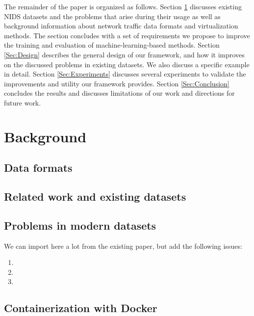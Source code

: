 \documentclass[sigconf]{acmart}
\begin{document}
The remainder of the paper is organized as follows. Section \ref{Sec:background} discusses existing NIDS datasets and the problems that arise during their usage as well as background information about network traffic data formats and virtualization methods. The section concludes with a set of requirements we propose to improve the training and evaluation of machine-learning-based methods. Section \ref{Sec:Design} describes the general design of our framework, and how it improves on the discussed problems in existing datasets. We also discuss a specific example in detail. Section \ref{Sec:Experiments} discusses several experiments to validate the improvements and utility our framework provides. 
Section \ref{Sec:Conclusion} concludes the results and discusses limitations of our work and directions for future work.


\section{Background}\label{Sec:background}

\subsection{Data formats}

\subsection{Related work and existing datasets}

\subsection{Problems in modern datasets}\label{Sec:problems}

We can import here a lot from the existing paper, but add the following issues:

\begin{enumerate}

\item 

\item 

\item 

\end{enumerate}


\subsection{Containerization with Docker}
\end{document}
